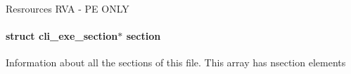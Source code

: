 Resrources R\-V\-A -\/ P\-E O\-N\-L\-Y \hypertarget{structcli__exe__info_a1c449c2a02971006b72d8ab755684716}{
\paragraph[{section}]{\setlength{\rightskip}{0pt plus 5cm}struct {\bf cli\-\_\-exe\-\_\-section}$\ast$ section}}\label{structcli__exe__info_a1c449c2a02971006b72d8ab755684716}
Information about all the sections of this file. This array has {\ttfamily nsection} elements 